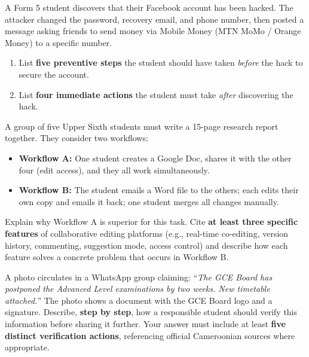 \documentclass[11pt]{article}
\begin{document}
\begin{exercice}
A Form 5 student discovers that their Facebook account has been hacked. The attacker changed the password, recovery email, and phone number, then posted a message asking friends to send money via Mobile Money (MTN MoMo / Orange Money) to a specific number.
\begin{enumerate}
    \item List \textbf{five preventive steps} the student should have taken \emph{before} the hack to secure the account.
    \item List \textbf{four immediate actions} the student must take \emph{after} discovering the hack.
\end{enumerate}
\end{exercice}

\begin{exercice}
A group of five Upper Sixth students must write a 15-page research report together. They consider two workflows:
\begin{itemize}
    \item \textbf{Workflow A:} One student creates a Google Doc, shares it with the other four (edit access), and they all work simultaneously.
    \item \textbf{Workflow B:} The student emails a Word file to the others; each edits their own copy and emails it back; one student merges all changes manually.
\end{itemize}
Explain why Workflow A is superior for this task. Cite \textbf{at least three specific features} of collaborative editing platforms (e.g., real-time co-editing, version history, commenting, suggestion mode, access control) and describe how each feature solves a concrete problem that occurs in Workflow B.
\end{exercice}

\begin{exercice}
A photo circulates in a WhatsApp group claiming: ``\emph{The GCE Board has postponed the Advanced Level examinations by two weeks. New timetable attached.}'' The photo shows a document with the GCE Board logo and a signature.
Describe, \textbf{step by step}, how a responsible student should verify this information before sharing it further. Your answer must include at least \textbf{five distinct verification actions}, referencing official Cameroonian sources where appropriate.
\end{exercice}
\end{document}
